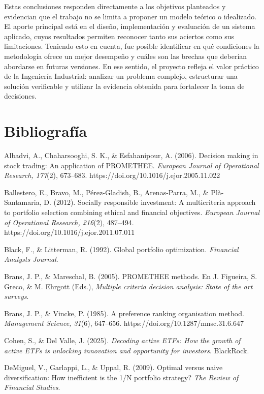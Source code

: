 \documentclass[12pt,letterpaper]{article}
\newcommand{\apa}[1]{\begingroup\sloppy\hangindent=1.25cm\hangafter=1 #1\par\vspace{0.35em}\endgroup}
\begin{document}
Estas conclusiones responden directamente a los objetivos planteados y evidencian que el trabajo no se limita a proponer un modelo teórico o idealizado. El aporte principal está en el diseño, implementación y evaluación de un sistema aplicado, cuyos resultados permiten reconocer tanto sus aciertos como sus limitaciones. Teniendo esto en cuenta, fue posible identificar en qué condiciones la metodología ofrece un mejor desempeño y cuáles son las brechas que deberían abordarse en futuras versiones. En ese sentido, el proyecto refleja el valor práctico de la Ingeniería Industrial: analizar un problema complejo, estructurar una solución verificable y utilizar la evidencia obtenida para fortalecer la toma de decisiones.


\clearpage
\section{Bibliografía}
\label{sec:bibliografia}

\apa{Albadvi, A., Chaharsooghi, S. K., \& Esfahanipour, A. (2006). Decision making in stock trading: An application of PROMETHEE. \textit{European Journal of Operational Research, 177}(2), 673--683. https://doi.org/10.1016/j.ejor.2005.11.022}

\apa{Ballestero, E., Bravo, M., Pérez-Gladish, B., Arenas-Parra, M., \& Plà-Santamaria, D. (2012). Socially responsible investment: A multicriteria approach to portfolio selection combining ethical and financial objectives. \textit{European Journal of Operational Research, 216}(2), 487--494. https://doi.org/10.1016/j.ejor.2011.07.011}

\apa{Black, F., \& Litterman, R. (1992). Global portfolio optimization. \textit{Financial Analysts Journal}.}

\apa{Brans, J. P., \& Mareschal, B. (2005). PROMETHEE methods. En J. Figueira, S. Greco, \& M. Ehrgott (Eds.), \textit{Multiple criteria decision analysis: State of the art surveys}.}

\apa{Brans, J. P., \& Vincke, P. (1985). A preference ranking organisation method. \textit{Management Science, 31}(6), 647--656. https://doi.org/10.1287/mnsc.31.6.647}

\apa{Cohen, S., \& Del Valle, J. (2025). \textit{Decoding active ETFs: How the growth of active ETFs is unlocking innovation and opportunity for investors}. BlackRock.}

\apa{DeMiguel, V., Garlappi, L., \& Uppal, R. (2009). Optimal versus naive diversification: How inefficient is the 1/N portfolio strategy? \textit{The Review of Financial Studies}.}
\end{document}
